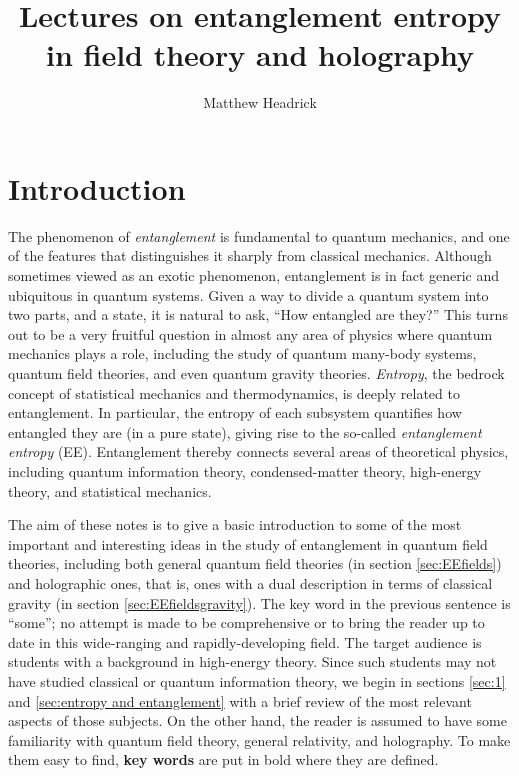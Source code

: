 \documentclass[11pt]{article}
\title{\boldmath Lectures on entanglement entropy in field theory and holography
}
\author{Matthew Headrick}
\affiliation{Martin Fisher School of Physics, Brandeis University, Waltham MA, USA}
\begin{document}
 
\maketitle
\flushbottom

\section{Introduction}
\label{sec:intro}

The phenomenon of \emph{entanglement} is fundamental to quantum mechanics, and one of the features that distinguishes it sharply from classical mechanics. Although sometimes viewed as an exotic phenomenon, entanglement is in fact generic and ubiquitous in quantum systems. Given a way to divide a quantum system into two parts, and a state, it is natural to ask, ``How entangled are they?'' This turns out to be a very fruitful question in almost any area of physics where quantum mechanics plays a role, including the study of quantum many-body systems, quantum field theories, and even quantum gravity theories. \emph{Entropy}, the bedrock concept of statistical mechanics and thermodynamics, is deeply related to entanglement. In particular, the entropy of each subsystem quantifies how entangled they are (in a pure state), giving rise to the so-called \emph{entanglement entropy} (EE). Entanglement thereby connects several areas of theoretical physics, including quantum information theory, condensed-matter theory, high-energy theory, and statistical mechanics.

The aim of these notes is to give a basic introduction to some of the most important and interesting ideas in the study of entanglement in quantum field theories, including both general quantum field theories (in section \ref{sec:EEfields}) and holographic ones, that is, ones with a dual description in terms of classical gravity (in section \ref{sec:EEfieldsgravity}). The key word in the previous sentence is ``some''; no attempt is made to be comprehensive or to bring the reader up to date in this wide-ranging and rapidly-developing field. The target audience is students with a background in high-energy theory. Since such students may not have studied classical or quantum information theory, we begin in sections \ref{sec:1} and \ref{sec:entropy and entanglement} with a brief review of the most relevant aspects of those subjects. On the other hand, the reader is assumed to have some familiarity with quantum field theory, general relativity, and holography. To make them easy to find, \textbf{key words} are put in bold where they are defined.
\end{document}
